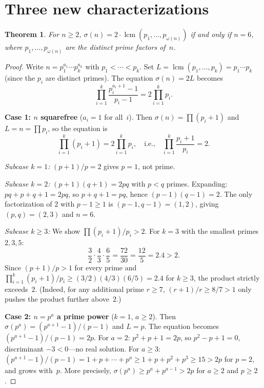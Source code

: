 \documentclass[11pt]{amsart}
\newtheorem{theorem}{Theorem}
\theoremstyle{remark}
\begin{document}
\section{Three new characterizations}

\begin{theorem}\label{thm:sigma-lcm}
For $n \geq 2$, $\sigma(n) = 2 \cdot \operatorname{lcm}(p_1, \ldots, p_{\omega(n)})$
if and only if $n = 6$, where $p_1, \ldots, p_{\omega(n)}$ are the distinct
prime factors of~$n$.
\end{theorem}

\begin{proof}
Write $n = p_1^{a_1} \cdots p_k^{a_k}$ with $p_1 < \cdots < p_k$.
Set $L = \operatorname{lcm}(p_1, \ldots, p_k) = p_1 \cdots p_k$
(since the $p_i$ are distinct primes).
The equation $\sigma(n) = 2L$ becomes
\[
  \prod_{i=1}^{k} \frac{p_i^{a_i+1} - 1}{p_i - 1}
  = 2 \prod_{i=1}^{k} p_i.
\]

\textbf{Case 1: $n$ squarefree} ($a_i = 1$ for all~$i$).
Then $\sigma(n) = \prod (p_i + 1)$ and $L = n = \prod p_i$, so the equation is
\[
  \prod_{i=1}^{k} (p_i + 1) = 2 \prod_{i=1}^{k} p_i,
  \quad\text{i.e.,}\quad
  \prod_{i=1}^{k} \frac{p_i + 1}{p_i} = 2.
\]

\emph{Subcase $k = 1$:} $(p+1)/p = 2$ gives $p = 1$, not prime.

\emph{Subcase $k = 2$:} $(p+1)(q+1) = 2pq$ with $p < q$ primes.
Expanding: $pq + p + q + 1 = 2pq$, so $p + q + 1 = pq$,
hence $(p-1)(q-1) = 2$.
The only factorization of $2$ with $p - 1 \geq 1$ is
$(p-1, q-1) = (1, 2)$, giving $(p, q) = (2, 3)$ and $n = 6$.

\emph{Subcase $k \geq 3$:} We show $\prod (p_i+1)/p_i > 2$.
For $k = 3$ with the smallest primes $2, 3, 5$:
\[
  \frac{3}{2} \cdot \frac{4}{3} \cdot \frac{6}{5}
  = \frac{72}{30} = \frac{12}{5} = 2.4 > 2.
\]
Since $(p+1)/p > 1$ for every prime and
$\prod_{i=1}^{k} (p_i+1)/p_i \geq (3/2)(4/3)(6/5) = 2.4$
for $k \geq 3$, the product strictly exceeds~$2$.
(Indeed, for any additional prime $r \geq 7$,
$(r+1)/r \geq 8/7 > 1$ only pushes the product further above~$2$.)

\textbf{Case 2: $n = p^a$ a prime power} ($k = 1$, $a \geq 2$).
Then $\sigma(p^a) = (p^{a+1}-1)/(p-1)$ and $L = p$.
The equation becomes $(p^{a+1}-1)/(p-1) = 2p$.
For $a = 2$: $p^2 + p + 1 = 2p$, so $p^2 - p + 1 = 0$,
discriminant $-3 < 0$---no real solution.
For $a \geq 3$: $(p^{a+1}-1)/(p-1) = 1 + p + \cdots + p^a \geq 1 + p + p^2 + p^3
\geq 15 > 2p$ for $p = 2$, and grows with~$p$.
More precisely, $\sigma(p^a) \geq p^a + p^{a-1} > 2p$ for $a \geq 2$ and $p \geq 2$.


\end{proof}
\end{document}
